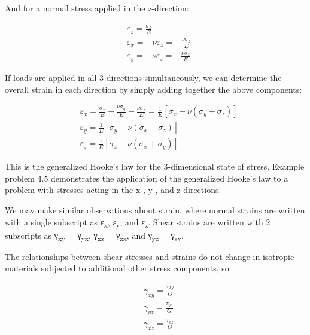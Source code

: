 \documentclass[
  letterpaper,
  DIV=11,
  numbers=noendperiod]{scrreprt}
\begin{document}
And for a normal stress applied in the z-direction:

\[
\begin{aligned}
& \varepsilon_z=\frac{\sigma_z}{E} \\
& \varepsilon_x=-\nu \varepsilon_z=-\frac{\nu \sigma_z}{E} \\
& \varepsilon_y=-\nu \varepsilon_z=-\frac{\nu \sigma_z}{E}
\end{aligned}
\]

If loads are applied in all 3 directions simultaneously, we can
determine the overall strain in each direction by simply adding together
the above components:

\[
\begin{aligned}
& \varepsilon_x=\frac{\sigma_x}{E}-\frac{\nu \sigma_y}{E}-\frac{\nu \sigma_z}{E}=\frac{1}{E}\left[\sigma_x-\nu\left(\sigma_y+\sigma_z\right)\right] \\
& \varepsilon_y=\frac{1}{E}\left[\sigma_y-\nu\left(\sigma_x+\sigma_z\right)\right] \\
& \varepsilon_z=\frac{1}{E}\left[\sigma_z-\nu\left(\sigma_x+\sigma_y\right)\right]
\end{aligned}
\]

This is the generalized Hooke's law for the 3-dimensional state of
stress. Example problem 4.5 demonstrates the application of the
generalized Hooke's law to a problem with stresses acting in the x-, y-,
and z-directions.

We may make similar observations about strain, where normal strains are
written with a single subscript as ε\textsubscript{x},
ε\textsubscript{y}, and ε\textsubscript{z}. Shear strains are written
with 2 subscripts as γ\textsubscript{xy} = γ\textsubscript{yx},
γ\textsubscript{xz} = γ\textsubscript{zx}, and γ\textsubscript{yz} =
γ\textsubscript{zy}.

The relationships between shear stresses and strains do not change in
isotropic materials subjected to additional other stress components, so:

\[
\begin{aligned}
& \gamma_{xy}=\frac{\tau_{xy}}{G} \\
& \gamma_{yz}=\frac{\tau_{yz}}{G} \\
& \gamma_{xz}=\frac{\tau_{xz}}{G}
\end{aligned}
\]
\end{document}
